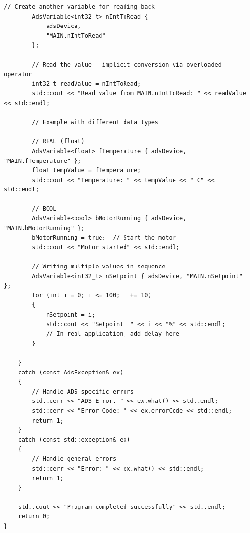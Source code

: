 \documentclass[11pt,a4paper]{article}
\begin{document}
\begin{lstlisting}[style=cppstyle]
        // Create another variable for reading back
        AdsVariable<int32_t> nIntToRead {
            adsDevice,
            "MAIN.nIntToRead"
        };
        
        // Read the value - implicit conversion via overloaded operator
        int32_t readValue = nIntToRead;
        std::cout << "Read value from MAIN.nIntToRead: " << readValue << std::endl;
        
        // Example with different data types
        
        // REAL (float)
        AdsVariable<float> fTemperature { adsDevice, "MAIN.fTemperature" };
        float tempValue = fTemperature;
        std::cout << "Temperature: " << tempValue << " C" << std::endl;
        
        // BOOL
        AdsVariable<bool> bMotorRunning { adsDevice, "MAIN.bMotorRunning" };
        bMotorRunning = true;  // Start the motor
        std::cout << "Motor started" << std::endl;
        
        // Writing multiple values in sequence
        AdsVariable<int32_t> nSetpoint { adsDevice, "MAIN.nSetpoint" };
        for (int i = 0; i <= 100; i += 10)
        {
            nSetpoint = i;
            std::cout << "Setpoint: " << i << "%" << std::endl;
            // In real application, add delay here
        }
        
    }
    catch (const AdsException& ex)
    {
        // Handle ADS-specific errors
        std::cerr << "ADS Error: " << ex.what() << std::endl;
        std::cerr << "Error Code: " << ex.errorCode << std::endl;
        return 1;
    }
    catch (const std::exception& ex)
    {
        // Handle general errors
        std::cerr << "Error: " << ex.what() << std::endl;
        return 1;
    }
    
    std::cout << "Program completed successfully" << std::endl;
    return 0;
}
\end{lstlisting}
\end{document}
